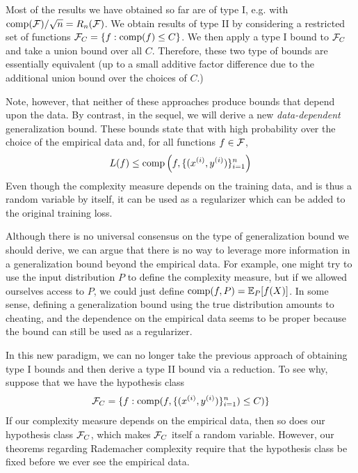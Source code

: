 \begin{remark}
    Most of the results we have obtained so far are of type I, e.g. with $\text{comp}(\cF)/\sqrt{n} = R_n(\cF)$. We obtain results of type II by considering a restricted set of functions $\cF_C = \{f : \text{comp}(f) \leq C\}$. We then apply a type I bound to $\cF_C$ and take a union bound over all $C$. Therefore, these two type of bounds are essentially equivalent (up to a small additive factor difference due to the additional union bound over the choices of $C$.)
\end{remark}

Note, however, that neither of these approaches produce bounds that depend upon the data. By contrast, in the sequel, we will derive a new \textit{data-dependent} generalization bound. These bounds state that with high probability over the choice of the empirical data and, for all functions $f\in \cF$,
\begin{align}
    L(f) \leq \text{comp}\left (f, \{(x\sp{i}, y\sp{i})\}_{i = 1}^n\right)
\end{align}
Even though the complexity measure depends on the training data, and is thus a random variable by itself, it can be used as a regularizer which can be added to the original training loss.

\begin{remark}
Although there is no universal consensus on the type of generalization bound we should derive, we can argue that there is no way to leverage more information in a generalization bound beyond the empirical data. For example, one might try to use the input distribution $P$ to define the complexity measure, but if we allowed ourselves access to $P$, we could just define $\text{comp}(f, P) = \Exp_P[f(X)]$. In some sense, defining a generalization bound using the true distribution amounts to cheating, and the dependence on the empirical data seems to be proper because the bound can still be used as a regularizer. %
\end{remark}

In this new paradigm, we can no longer take the previous approach of obtaining type I bounds and then derive a type II bound via a reduction. To see why, suppose that we have the hypothesis class
\begin{align}
    \cF_C = \{f: \text{comp}(f, \{(x\sp{i}, y\sp{i})\}_{i=1}^n) \leq C)\}
\end{align}
If our complexity measure depends on the empirical data, then so does our hypothesis class $\cF_C$, which makes $\cF_C$ itself a random variable. However, our theorems regarding Rademacher complexity require that the hypothesis class be fixed before we ever see the empirical data.

